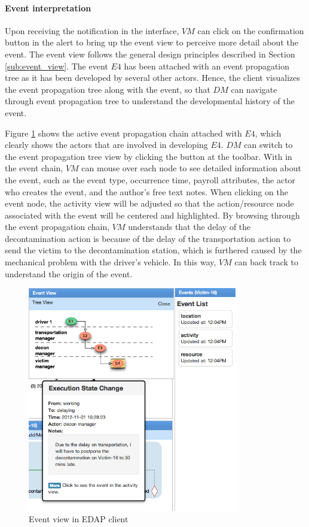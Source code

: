 \paragraph*{Event interpretation} %
\label{par:event_interpretation}
Upon receiving the notification in the interface, $VM$ can click on the confirmation button in the alert to bring up the event view to perceive more detail about the event. The event view follows the general design principles described in Section \ref{sub:event_view}. The event $E4$ has been attached with an event propagation tree as it has been developed by several other actors. Hence, the client visualizes the event propagation tree along with the event, so that $DM$ can navigate through event propagation tree to understand the developmental history of the event. 

Figure \ref{fig:vm_interface_event} shows the active event propagation chain attached with $E4$, which clearly shows the actors that are involved in developing $E4$. $DM$ can switch to the event propagation tree view by clicking the button at the toolbar. With in the event chain, $VM$ can mouse over each node to see detailed information about the event, such as the event type, occurrence time, payroll attributes, the actor who creates the event, and the author's free text notes. When clicking on the event node, the activity view will be adjusted so that the action/resource node associated with the event will be centered and highlighted. By browsing through the event propagation chain, $VM$ understands that the delay of the decontamination action is because of the delay of the transportation action to send the victim to the decontamination station, which is furthered caused by the mechanical problem with the driver's vehicle. In this way, $VM$ can back track to understand the origin of the event.

\begin{figure}[htbp] %
	\centering
	\includegraphics[width=3.6in]{vm_interface_event.jpg} 
	\caption{Event view in EDAP client}
	\label{fig:vm_interface_event}
\end{figure}

